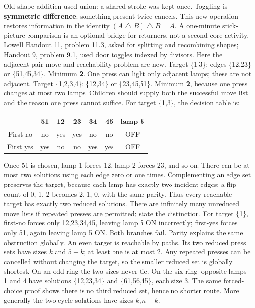 \documentclass[12pt]{extarticle}
\begin{document}
Old shape addition used union: a shared stroke was kept once. Toggling is \textbf{symmetric difference}: something present twice cancels. This new operation restores information in the identity \((A\mathbin{\triangle}B)\mathbin{\triangle}B=A\). A one-minute stick-picture comparison is an optional bridge for returners, not a second core activity. Lowell Handout 11, problem 11.3, asked for splitting and recombining shapes; Handout 9, problem 9.1, used door toggles indexed by divisors. Here the adjacent-pair move and reachability problem are new.
\newpage
{}
Target \{1,3\}: edges \{12,23\} or \{51,45,34\}. Minimum \textbf{2}. One press can light only adjacent lamps; these are not adjacent. Target \{1,2,3,4\}: \{12,34\} or \{23,45,51\}. Minimum \textbf{2}, because one press changes at most two lamps. Children should supply both the successful move list and the reason one press cannot suffice.
For target \{1,3\}, the decision table is:
\begin{center}\renewcommand{\arraystretch}{1.4}\begin{tabular}{c|ccccc|c}&51&12&23&34&45&lamp 5\\\hline First no&no&yes&yes&no&no&OFF\\First yes&yes&no&no&yes&yes&OFF\end{tabular}\end{center}
Once 51 is chosen, lamp 1 forces 12, lamp 2 forces 23, and so on. There can be at most two solutions using each edge zero or one times. Complementing an edge set preserves the target, because each lamp has exactly two incident edges: a flip count of 0, 1, 2 becomes 2, 1, 0, with the same parity. Thus every reachable target has exactly two reduced solutions. There are infinitely many unreduced move lists if repeated presses are permitted; state the distinction.
For target \{1\}, first-no forces only 12,23,34,45, leaving lamp 5 ON incorrectly; first-yes forces only 51, again leaving lamp 5 ON. Both branches fail. Parity explains the same obstruction globally.
An even target is reachable by paths. Its two reduced press sets have sizes \(k\) and \(5-k\); at least one is at most 2. Any repeated presses can be cancelled without changing the target, so the smaller reduced set is globally shortest. On an odd ring the two sizes never tie. On the six-ring, opposite lamps 1 and 4 have solutions \{12,23,34\} and \{61,56,45\}, each size 3. The same forced-choice proof shows there is no third reduced set, hence no shorter route. More generally the two cycle solutions have sizes \(k,n-k\).
\end{document}
